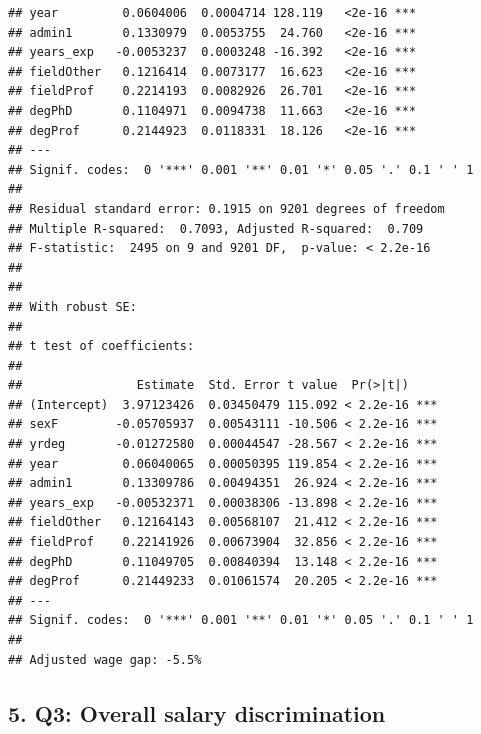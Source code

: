 \documentclass[
]{article}
\begin{document}
\begin{verbatim}
## year         0.0604006  0.0004714 128.119   <2e-16 ***
## admin1       0.1330979  0.0053755  24.760   <2e-16 ***
## years_exp   -0.0053237  0.0003248 -16.392   <2e-16 ***
## fieldOther   0.1216414  0.0073177  16.623   <2e-16 ***
## fieldProf    0.2214193  0.0082926  26.701   <2e-16 ***
## degPhD       0.1104971  0.0094738  11.663   <2e-16 ***
## degProf      0.2144923  0.0118331  18.126   <2e-16 ***
## ---
## Signif. codes:  0 '***' 0.001 '**' 0.01 '*' 0.05 '.' 0.1 ' ' 1
## 
## Residual standard error: 0.1915 on 9201 degrees of freedom
## Multiple R-squared:  0.7093, Adjusted R-squared:  0.709 
## F-statistic:  2495 on 9 and 9201 DF,  p-value: < 2.2e-16
## 
## 
## With robust SE:
## 
## t test of coefficients:
## 
##                Estimate  Std. Error t value  Pr(>|t|)    
## (Intercept)  3.97123426  0.03450479 115.092 < 2.2e-16 ***
## sexF        -0.05705937  0.00543111 -10.506 < 2.2e-16 ***
## yrdeg       -0.01272580  0.00044547 -28.567 < 2.2e-16 ***
## year         0.06040065  0.00050395 119.854 < 2.2e-16 ***
## admin1       0.13309786  0.00494351  26.924 < 2.2e-16 ***
## years_exp   -0.00532371  0.00038306 -13.898 < 2.2e-16 ***
## fieldOther   0.12164143  0.00568107  21.412 < 2.2e-16 ***
## fieldProf    0.22141926  0.00673904  32.856 < 2.2e-16 ***
## degPhD       0.11049705  0.00840394  13.148 < 2.2e-16 ***
## degProf      0.21449233  0.01061574  20.205 < 2.2e-16 ***
## ---
## Signif. codes:  0 '***' 0.001 '**' 0.01 '*' 0.05 '.' 0.1 ' ' 1
## 
## Adjusted wage gap: -5.5%
\end{verbatim}

\subsection{5. Q3: Overall salary
discrimination}\label{q3-overall-salary-discrimination}
\end{document}
